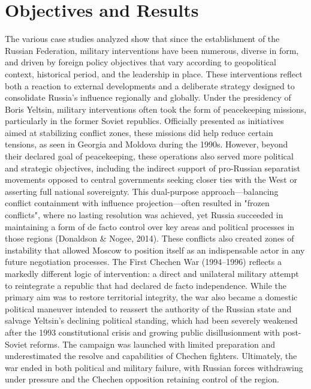 \documentclass[12pt]{article}
\begin{document}
\section*{Objectives and Results}

The various case studies analyzed show that since the establishment of the Russian Federation, military interventions have been numerous, diverse in form, and driven by foreign policy objectives that vary according to geopolitical context, historical period, and the leadership in place. These interventions reflect both a reaction to external developments and a deliberate strategy designed to consolidate Russia’s influence regionally and globally.
Under the presidency of Boris Yeltsin, military interventions often took the form of peacekeeping missions, particularly in the former Soviet republics. Officially presented as initiatives aimed at stabilizing conflict zones, these missions did help reduce certain tensions, as seen in Georgia and Moldova during the 1990s. However, beyond their declared goal of peacekeeping, these operations also served more political and strategic objectives, including the indirect support of pro-Russian separatist movements opposed to central governments seeking closer ties with the West or asserting full national sovereignty. This dual-purpose approach—balancing conflict containment with influence projection—often resulted in "frozen conflicts", where no lasting resolution was achieved, yet Russia succeeded in maintaining a form of de facto control over key areas and political processes in those regions (Donaldson & Nogee, 2014). These conflicts also created zones of instability that allowed Moscow to position itself as an indispensable actor in any future negotiation processes.
The First Chechen War (1994–1996) reflects a markedly different logic of intervention: a direct and unilateral military attempt to reintegrate a republic that had declared de facto independence. While the primary aim was to restore territorial integrity, the war also became a domestic political maneuver intended to reassert the authority of the Russian state and salvage Yeltsin’s declining political standing, which had been severely weakened after the 1993 constitutional crisis and growing public disillusionment with post-Soviet reforms. The campaign was launched with limited preparation and underestimated the resolve and capabilities of Chechen fighters. Ultimately, the war ended in both political and military failure, with Russian forces withdrawing under pressure and the Chechen opposition retaining control of the region.
\end{document}
